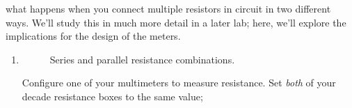 \documentclass[12pt]{article}
\begin{document}
\begin{enumerate}
  what happens when you connect multiple resistors in circuit in two
  different ways.  We'll study this in much more detail in a later
  lab; here, we'll explore the implications for the design of the
  meters. 
  \begin{enumerate}
  \item \label{item:identical}
    \begin{figure}
      \centering
      \qquad {}
      \caption{Series and parallel resistance combinations.}
      \label{fig:resistances}
    \end{figure}
    Configure one of your multimeters to measure resistance.  Set
    \textit{both} of your decade resistance boxes to the same value;

\end{enumerate}
\end{enumerate}
\end{document}
